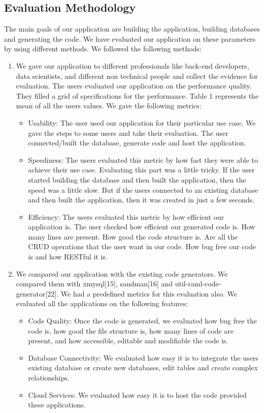 \documentclass[letterpaper, 10 pt, conference]{ieeeconf}
\begin{document}
\subsection{Evaluation Methodology}
The main goals of our application are building the application, building databases and generating the code.
We have evaluated our application on these parameters by using different methods. We followed the following methods:
\begin{enumerate}
  \item We gave our application to different professionals like back-end developers, data scientists, and different non technical people and collect the evidence for evaluation. The users evaluated our application on the performance quality. They filled a grid of specifications for the performance. Table 1 represents the mean of all the users values. We gave the following metrics:
  \begin{itemize}
    \item Usability: The user used our application for their particular use case. We gave the steps to some users and take their evaluation. The user connected/built the database, generate code and host the application. 
    \item Speediness: The users evaluated this metric by how fast they were able to achieve their use case. Evaluating this part was a little tricky. If the user started building the database and then built the application, then the speed was a little slow. But if the users connected to an existing database and then built the application, then it was created in just a few seconds.
    \item Efficiency: The users evaluated this metric by how efficient our application is. The user checked how efficient our generated code is. How many lines are present. How good the code structure is. Are all the CRUD operations that the user want in our code. How bug free our code is and how RESTful it is.
  \end{itemize}
  \item We compared our application with the existing code generators. We compared them with xmysql[15], sandman[16] and util-raml-code-generator[22]. We had a predefined metrics for this evaluation also. We evaluated all the applications on the following features:
  \begin{itemize}
    \item Code Quality: Once the code is generated, we evaluated how bug free the code is, how good the file structure is, how many lines of code are present, and how accessible, editable and modifiable the code is. 
    \item Database Connectivity: We evaluated how easy it is to integrate the users existing database or create new databases, edit tables and create complex relationships.
    \item Cloud Services: We evaluated how easy it is to host the code provided these applications.
  \end{itemize}
\end{enumerate} 
\end{document}
